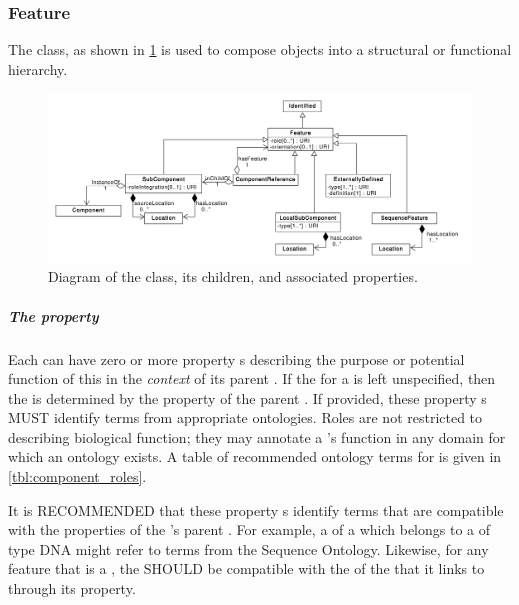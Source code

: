 \subsubsection{Feature}
\label{sec:Feature}

The  class, as shown in \ref{uml:subcomponent} is used to compose  objects into a structural or functional hierarchy. 

\begin{figure}[ht]
\begin{center}
\includegraphics[width=\textwidth]{uml/feature}
\caption[]{Diagram of the  class, its children, and associated properties.}
\label{uml:subcomponent}
\end{center}
\end{figure}

\subparagraph{The  property}\label{sec:role:F}

Each  can have zero or more  property s describing the purpose or potential function of this  in the \textit{context} of its parent .
If the  for a  is left unspecified, then the  is determined by the  property of the parent . 
If provided, these  property s MUST identify terms from appropriate ontologies. Roles are not restricted to describing biological function; they may annotate a 's function in any domain for which an ontology exists.
A table of recommended ontology terms for  is given in \ref{tbl:component_roles}.

It is RECOMMENDED that these  property s identify terms that are compatible with the  properties of the 's parent .
For example, a  of a  which belongs to a  of type DNA might refer to terms from the Sequence Ontology. 
Likewise, for any feature that is a , the  SHOULD be compatible with the  of the  that it links to through its  property.

